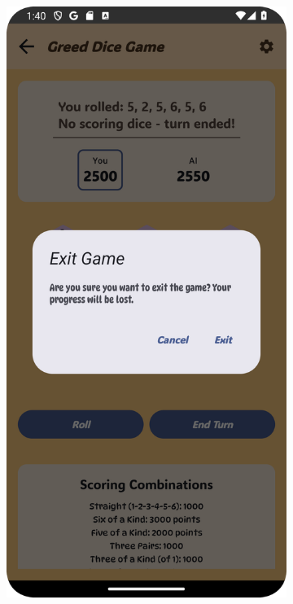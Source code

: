 \begin{figure}[h]
    \centering
    \begin{subfigure}[b]{0.27\textwidth}
        \includegraphics[width=\textwidth]{img/greed board2.png}

\end{subfigure}
\end{figure}
